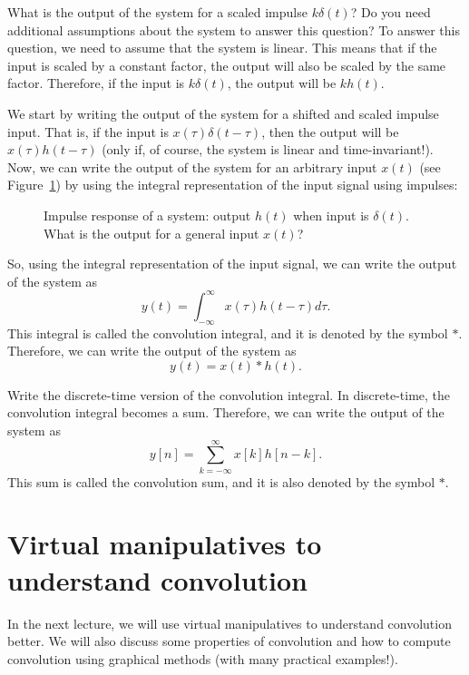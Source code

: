 \documentclass{ee102_notes}
\begin{document}
\begin{popquiz}
    What is the output of the system for a scaled impulse $k \delta(t)$? Do you need additional assumptions about the system to answer this question?
    \popqsplit
    To answer this question, we need to assume that the system is linear. This means that if the input is scaled by a constant factor, the output will also be scaled by the same factor. Therefore, if the input is $k \delta(t)$, the output will be $k h(t)$.
\end{popquiz}
We start by writing the output of the system for a shifted and scaled impulse input. That is, if the input is $x(\tau) \delta(t - \tau)$, then the output will be $x(\tau) h(t - \tau)$ (only if, of course, the system is linear and time-invariant!).
Now, we can write the output of the system for an arbitrary input $x(t)$ (see Figure~\ref{fig:convolution-buildup}) by using the integral representation of the input signal using impulses:
\begin{figure}[h]
\centering
{}
\caption{Impulse response of a system: output $h(t)$ when input is $\delta(t)$. What is the output for a general input $x(t)$?}
\label{fig:convolution-buildup}
\end{figure}
So, using the integral representation of the input signal, we can write the output of the system as
\[
y(t) = \int_{-\infty}^{\infty} x(\tau) h(t - \tau) d\tau.
\]
This integral is called the convolution integral, and it is denoted by the symbol $*$. Therefore, we can write the output of the system as
\[
y(t) = x(t) * h(t).
\]
\begin{popquiz}
    Write the discrete-time version of the convolution integral.
    \popqsplit
    In discrete-time, the convolution integral becomes a sum. Therefore, we can write the output of the system as
    \[
    y[n] = \sum_{k=-\infty}^{\infty} x[k] h[n - k].
    \]
    This sum is called the convolution sum, and it is also denoted by the symbol $*$.
\end{popquiz}
\section{Virtual manipulatives to understand convolution}
In the next lecture, we will use virtual manipulatives to understand convolution better. We will also discuss some properties of convolution and how to compute convolution using graphical methods (with many practical examples!).
\end{document}
